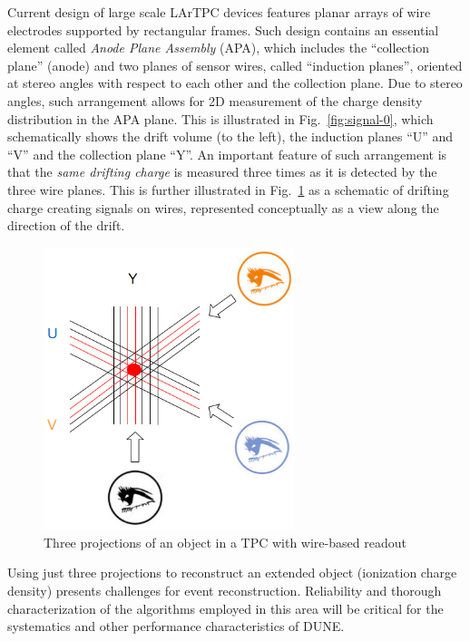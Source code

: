 Current design of large scale LArTPC devices features planar arrays of wire electrodes supported by
rectangular frames. Such design contains an essential element called \textit{Anode Plane Assembly} (APA), which includes the ``collection plane'' (anode)
and two planes of sensor wires, called ``induction planes'', oriented at stereo angles with respect to each other and the collection plane.
Due to stereo angles, such arrangement allows for 2D measurement of the charge density distribution in the APA plane.
This is illustrated in Fig.~\ref{fig:signal-0}, which schematically shows the drift volume (to the left), the induction planes ``U'' and ``V'' and
the collection plane ``Y''. An important feature of such arrangement is that the \textit{same drifting charge} is measured three times as it
is detected by the three wire planes. This is further illustrated in Fig.~\ref{fig:3projections} as a schematic of drifting charge creating signals on wires,
represented conceptually as a view along the direction of the drift.

\begin{figure}[h!]
	\centering
	\includegraphics[width=0.65\textwidth]{uvy_2.png}
	\caption{Three projections of an object in a TPC with wire-based readout}
	\label{fig:3projections}
\end{figure}

Using just three projections to reconstruct an extended object (ionization charge density) presents challenges for event reconstruction.
Reliability and thorough characterization of the algorithms employed in this area will be critical for the systematics and other performance characteristics of DUNE.

